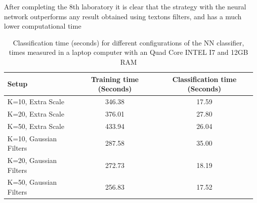 \documentclass[10pt,twocolumn,letterpaper]{article}
\begin{document}
After completing the 8th laboratory it is clear that the strategy with the neural network outperforms any result obtained using textons filters, and has a much lower computational time




\begin{table}[ht!]
\centering
\begin{tabular}{ l | c | c  }
Setup & Training time (Seconds) & Classification time (Seconds)    \\
\hline	
K=10, Extra Scale & 346.38 & 17.59 \\
K=20, Extra Scale & 376.01 & 27.80 \\
K=50, Extra Scale & 433.94 &  26.04\\
K=10, Gaussian Filters & 287.58 & 35.00 \\
K=20, Gaussian Filters & 272.73 & 18.19 \\
K=50, Gaussian Filters & 256.83 & 17.52 \\


\end{tabular}
\caption{Classification time (seconds) for different configurations of the NN classifier, times measured in a laptop computer with an Quad Core INTEL I7 and 12GB RAM}
\label{table:timesNN}
\end{table}


{\small


}
\end{document}
